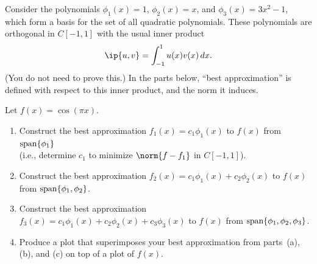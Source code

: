 Consider the polynomials $\phi_1(x) = 1$, $\phi_2(x) = x$, 
and $\phi_3(x) = 3x^2-1$, which form a basis for the set
of all quadratic polynomials.  These polynomials are 
orthogonal in $C[-1,1]$ with the usual inner product
\[ \ip{u,v} = \int_{-1}^1 u(x)v(x)\, dx.\]
(You do not need to prove this.) In the parts below,
``best approximation'' is defined with respect to this
inner product, and the norm it induces.

Let $f(x) = \cos(\pi x)$.
\begin{enumerate}
\item Construct the best approximation
           $f_1(x) = c_1 \phi_1(x)$
      to $f(x)$ from ${\rm span}\{\phi_1\}$ \\
      (i.e., determine $c_1$ to minimize $\norm{f - f_1}$ in $C[-1,1]$).
\vspace*{1em}
\item Construct the best approximation
           $f_2(x) = c_1 \phi_1(x) + c_2 \phi_2(x)$
      to $f(x)$ from ${\rm span}\{\phi_1, \phi_2\}$.
\vspace*{1em}
\item Construct the best approximation
           $f_3(x) = c_1 \phi_1(x) + c_2 \phi_2(x) + c_3 \phi_3(x)$
      to $f(x)$ from ${\rm span}\{\phi_1, \phi_2, \phi_3\}$.
\vspace*{-.25em}
\item  Produce a plot that superimposes your best approximation from parts~(a),
       (b), and (c) on top of a plot of $f(x)$.
\end{enumerate}


